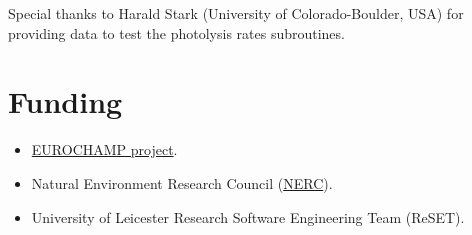 Special thanks to Harald Stark (University of Colorado-Boulder, USA)
for providing data to test the photolysis rates subroutines.

\section{Funding} \label{sec:funding}

\begin{itemize}
\item \href{https://www.eurochamp.org/}{EUROCHAMP project}.
\item Natural Environment Research Council (\href{https://nerc.ukri.org/}{NERC}).
\item University of Leicester Research Software Engineering Team (ReSET).
\end{itemize}
